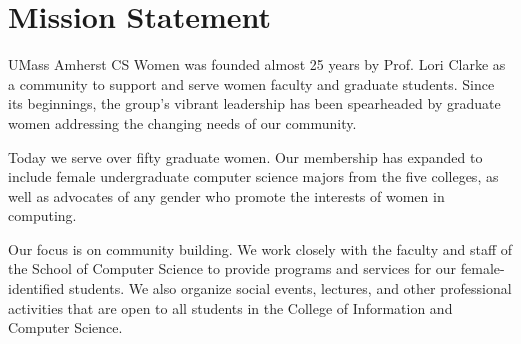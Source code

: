 \section{Mission Statement}
\label{sec:mission}

UMass Amherst CS Women was founded almost 25 years by Prof. Lori Clarke as a community to support and serve women faculty and graduate students. Since its beginnings, the group's vibrant leadership has been spearheaded by graduate women addressing the changing needs of our community.

Today we serve over fifty graduate women. Our membership has expanded to include female undergraduate computer science majors from the five colleges, as well as advocates of any gender who promote the interests of women in computing.

Our focus is on community building. We work closely with the faculty and staff of the School of Computer Science to provide programs and services for our female-identified students. We also organize social events, lectures, and other professional activities that are open to all students in the College of Information and Computer Science.
